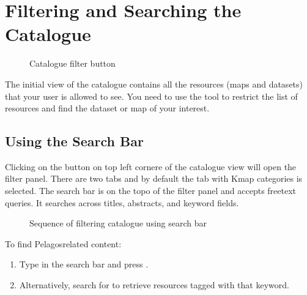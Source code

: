 \documentclass[letterpaper,10pt,english]{sphinxmanual}
\begin{document}
\section{Filtering and Searching the Catalogue}
\label{\detokenize{02_find_and_visualize:filtering-and-searching-the-catalogue}}\label{\detokenize{02_find_and_visualize:filtering}}
\begin{figure}[htbp]
\centering
\capstart

\noindent{}
\caption{Catalogue filter button}\label{\detokenize{02_find_and_visualize:id2}}\end{figure}

\sphinxAtStartPar
The initial view of the catalogue contains all the resources (maps and datasets) that your user is allowed to see.
You need to use the  tool to restrict the list of resources and find the dataset or map of your interest.


\subsection{Using the Search Bar}
\label{\detokenize{02_find_and_visualize:using-the-search-bar}}
\sphinxAtStartPar
Clicking on the  button on top left cornere of the catalogue view will open the filter panel.
There are two tabs and by default the tab with Kmap categories is selected. The search bar is on the topo of the filter panel and accepts free\sphinxhyphen{}text queries.
It searches across titles, abstracts, and keyword fields.

\begin{figure}[htbp]
\centering
\capstart

\noindent{}
\caption{Sequence of filtering catalogue using search bar}\label{\detokenize{02_find_and_visualize:id3}}\end{figure}

\sphinxAtStartPar
To find Pelagos\sphinxhyphen{}related content:
\begin{enumerate}
%
\item {} 
\sphinxAtStartPar
Type  in the search bar and press .

\item {} 
\sphinxAtStartPar
Alternatively, search for  to retrieve resources tagged
with that keyword.

\end{enumerate}
\end{document}
